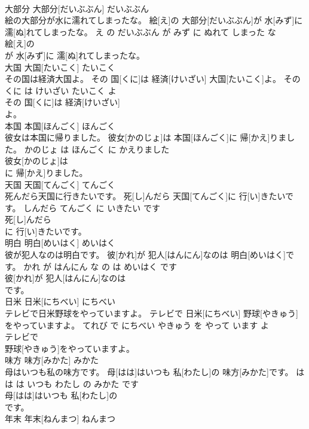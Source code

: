 \documentclass[8pt]{extreport}
\begin{document}
\begin{CJK}{UTF8}{min}
\\	大部分	大部分[だいぶぶん]	だいぶぶん	
\\	絵の大部分が水に濡れてしまったな。	絵[え]の 大部分[だいぶぶん]が 水[みず]に 濡[ぬ]れてしまったな。	え の だいぶぶん が みず に ぬれて しまった な	
\\	絵[え]の
\\	が 水[みず]に 濡[ぬ]れてしまったな。			
\\	大国	大国[たいこく]	たいこく	
\\	その国は経済大国よ。	その 国[くに]は 経済[けいざい] 大国[たいこく]よ。	その くに は けいざい たいこく よ	
\\	その 国[くに]は 経済[けいざい]
\\	よ。			
\\	本国	本国[ほんごく]	ほんごく	
\\	彼女は本国に帰りました。	彼女[かのじょ]は 本国[ほんごく]に 帰[かえ]りました。	かのじょ は ほんごく に かえりました	
\\	彼女[かのじょ]は
\\	に 帰[かえ]りました。			
\\	天国	天国[てんごく]	てんごく	
\\	死んだら天国に行きたいです。	死[し]んだら 天国[てんごく]に 行[い]きたいです。	しんだら てんごく に いきたい です	
\\	死[し]んだら
\\	に 行[い]きたいです。			
\\	明白	明白[めいはく]	めいはく	
\\	彼が犯人なのは明白です。	彼[かれ]が 犯人[はんにん]なのは 明白[めいはく]です。	かれ が はんにん な の は めいはく です	
\\	彼[かれ]が 犯人[はんにん]なのは
\\	です。			
\\	日米	日米[にちべい]	にちべい	
\\	テレビで日米野球をやっていますよ。	テレビで 日米[にちべい] 野球[やきゅう]をやっていますよ。	てれび で にちべい やきゅう を やって います よ	
\\	テレビで
\\	野球[やきゅう]をやっていますよ。			
\\	味方	味方[みかた]	みかた	
\\	母はいつも私の味方です。	母[はは]はいつも 私[わたし]の 味方[みかた]です。	はは は いつも わたし の みかた です	
\\	母[はは]はいつも 私[わたし]の
\\	です。			
\\	年末	年末[ねんまつ]	ねんまつ	

\end{CJK}
\end{document}
